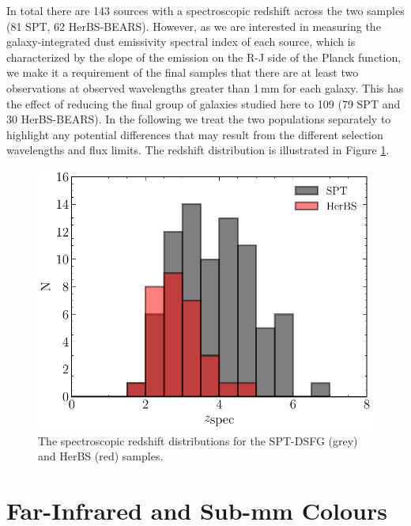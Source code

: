 In total there are 143 sources with a spectroscopic redshift across the two samples (81 SPT, 62 HerBS-BEARS). However, as we are interested in measuring the galaxy-integrated dust emissivity spectral index of each source, which is characterized by the slope of the emission on the R-J side of the Planck function, we make it a requirement of the final samples that there are at least two observations at observed wavelengths greater than 1\,mm for each galaxy. This has the effect of reducing the final group of galaxies studied here to 109 (79 SPT and 30 HerBS-BEARS). In the following we treat the two populations separately to highlight any potential differences that may result from the different selection wavelengths and flux limits. The redshift distribution is illustrated in Figure \ref{fig:spt_herbs_redshift}.

\begin{figure}
	\centering
	\includegraphics[width=0.75\columnwidth]{Figures/spt_herbs_redshift_distribution.pdf}
	\caption{The spectroscopic redshift distributions for the SPT-DSFG (grey) and HerBS (red) samples.}
	\label{fig:spt_herbs_redshift}
\end{figure}

\section{Far-Infrared and Sub-mm Colours}
\label{sec:fir_submm_colours}

